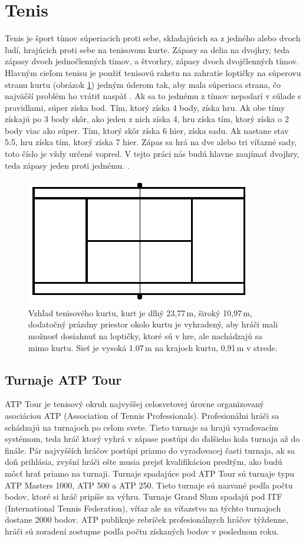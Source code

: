 \section{Tenis}
Tenis je šport tímov súperiacich proti sebe, skladajúcich sa z jedného alebo dvoch ľudí, hrajúcich proti sebe na tenisovom kurte.
Zápasy sa delia na dvojhry, teda zápasy dvoch jednočlenných tímov, a štvorhry, zápasy dvoch dvojčlenných tímov.
Hlavným cieľom tenisu je použiť tenisovú raketu na zahratie loptičky na súperovu stranu kurtu (obrázok \ref{court}) jedným úderom tak, aby mala súperiaca strana, čo najväčší problém ho vrátiť naspäť \citep{tenis:kor}. 
Ak sa to jednému z tímov nepodarí v súlade s pravidlami, súper získa bod.
Tím, ktorý získa 4 body, získa hru. Ak obe tímy získajú po 3 body skôr, ako jeden z nich získa 4, hru získa tím, ktorý získa o 2 body viac ako súper.
Tím, ktorý skôr získa 6 hier, získa sadu. Ak nastane stav 5:5, hru získa tím, ktorý získa 7 hier.
Zápas sa hrá na dve alebo tri víťazné sady, toto číslo je vždy určené vopred.
V tejto práci nás budú hlavne zaujímať dvojhry, teda zápasy jeden proti jednému.
\citep{hry2}.

\noindent
\begin{figure} 
\centering
\includegraphics[scale=0.7]{../img/court.png}
\caption{Vzhľad tenisového kurtu, kurt je dlhý 23,77\,m, široký 10,97\,m, dodatočný prázdny priestor okolo kurtu je vyhradený, aby hráči mali možnosť dosiahnuť na loptičky, ktoré sú v hre, ale nachádzajú sa mimo kurtu. Sieť je vysoká 1.07\,m na krajoch kurtu, 0,91\,m v strede.}
\label{court}
\end{figure}

\subsection{Turnaje ATP Tour}
ATP Tour je tenisový okruh najvyššej celosvetovej úrovne organizovaný asociáciou ATP (Association of Tennis Professionals).
Profesionálni hráči sa schádzajú na turnajoch po celom svete.
Tieto turnaje sa hrajú vyraďovacím systémom, teda hráč ktorý vyhrá v zápase postúpi do ďalšieho kola turnaja až do finále.
Pár najvyšších hráčov postúpi priamo do vyraďovacej časti turnaja, ak sa doň prihlásia, zvyšní hráči ešte musia prejsť kvalifikáciou predtým, ako budú môcť hrať priamo na turnaji.
Turnaje spadajúce pod ATP Tour sú turnaje typu ATP Masters 1000, ATP 500 a ATP 250. Tieto turnaje sú nazvané podľa počtu bodov, ktoré si hráč pripíše za výhru.
Turnaje Grand Slam spadajú pod ITF (International Tennis Federation), víťaz ale za víťazstvo na týchto turnajoch dostane 2000 bodov.
ATP publikuje rebríček profesionálnych hráčov týždenne, hráči sú zoradení zostupne podľa počtu získaných bodov v poslednom roku.


